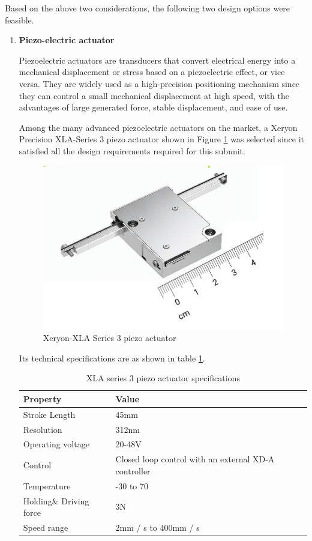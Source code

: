 Based on the above two considerations, the following two design options were feasible.
\begin{enumerate}
    \item \textbf{Piezo-electric actuator}
    \par
    Piezoelectric actuators are transducers that convert electrical energy into a mechanical displacement or stress based on a piezoelectric effect, or vice versa. They are widely used as a high-precision positioning mechanism since they can control a small mechanical displacement at high speed, with the advantages of large generated force, stable displacement, and ease of use\cite{gao2020piezoelectric}. 
    \par
    Among the many advanced piezoelectric actuators on the market, a Xeryon Precision XLA-Series 3 piezo actuator shown in Figure \ref{fig:piezo_actuator} was selected since it satisfied all the design requirements required for this subunit.
    \begin{figure}[H]
        \centering
        \includegraphics{Figures/Xeryon-XLA-3-1.png}
        \caption[Xeryon-XLA Series 3 piezo actuator]{Xeryon-XLA Series 3 piezo actuator \cite{xla3}}
        \label{fig:piezo_actuator}
    \end{figure}
    Its technical specifications are as shown in table \ref{tab:XLA_stuff}.
    \begin{table}[H]
    \centering
      \caption[XLA series 3 piezo actuator specifications]{XLA series 3 piezo actuator specifications \cite{xla3}}
    \begin{tabular}{|l|l|}
    \hline
    \textbf{Property} & \textbf{Value} \\ \hline
    Stroke Length & 45mm \\ \hline
    Resolution & 312nm \\ \hline
    Operating voltage & 20-48V \\ \hline
    Control & Closed loop control with an external XD-A controller \\ \hline
    Temperature & -30  to 70 \\ \hline
    Holding\& Driving  force & 3N \\ \hline
    Speed range & 2mm / s to 400mm / s \\ \hline
    \end{tabular}
    \label{tab:XLA_stuff}
    \end{table}
    

\end{enumerate}
